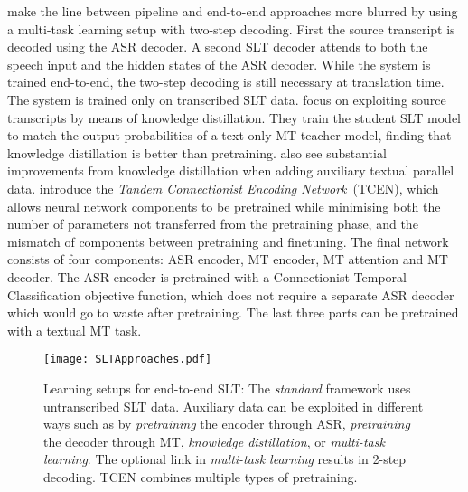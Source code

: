 \documentclass{svjour3}
\begin{document}
\citet{anastasopoulos-chiang-2018-tied} make the line between pipeline and end-to-end approaches more blurred by using a multi-task learning setup with two-step decoding.
First the source transcript is decoded using the ASR decoder.
A second SLT decoder attends to both the speech input and the hidden states of the ASR decoder.
While the system is trained end-to-end, the two-step decoding is still necessary at translation time.
The system is trained only on transcribed SLT data.
\citet{liu2019end} focus on exploiting source transcripts by means of knowledge distillation.
They train the student SLT model to match the output probabilities of a text-only MT teacher model,
finding that knowledge distillation is better than pretraining.
\citet{inaguma2019espnet} also see substantial improvements from knowledge distillation when adding auxiliary textual parallel data.
\citet{wang2019bridging} introduce the \emph{Tandem Connectionist Encoding Network}~(TCEN),
which allows neural network components to be pretrained while
minimising both the number of parameters not transferred from the pretraining phase,
and the mismatch of components between pretraining and finetuning.
The final network consists of four components: ASR encoder, MT encoder, MT attention and MT decoder.
The ASR encoder is pretrained with a Connectionist Temporal Classification objective function,
which does not require a separate ASR decoder which would go to waste after pretraining.
The last three parts can be pretrained with a textual MT task.

\begin{figure}[t]
    \centering
    \texttt{[image: SLTApproaches.pdf]}
    \caption{Learning setups for end-to-end SLT: The \textit{standard} framework uses untranscribed SLT data. Auxiliary data can be exploited in different ways such as by \textit{pretraining} the encoder through ASR, \textit{pretraining} the decoder through MT, \textit{knowledge distillation}, or \textit{multi-task learning}. The optional link in \textit{multi-task learning} results in 2-step decoding. TCEN combines multiple types of pretraining.
    \label{fig:slt:approaches:e2e:a}}
\end{figure}
\end{document}
